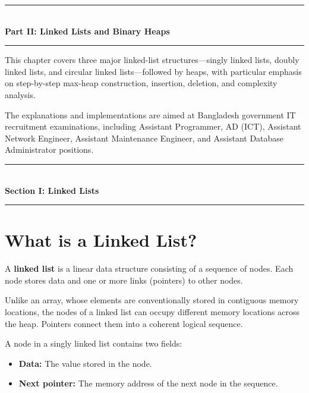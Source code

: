 \begin{center}
\vspace{1em}
{\color{primary}\rule{0.5\textwidth}{1.5pt}}\\[6pt]
{\Large\bfseries\color{primary} Part II: Linked Lists and Binary Heaps}\\[3pt]
{\color{primary}\rule{0.5\textwidth}{1.5pt}}
\vspace{1em}
\end{center}

This chapter covers three major linked-list structures---singly linked lists, doubly linked lists, and circular linked lists---followed by heaps, with particular emphasis on step-by-step max-heap construction, insertion, deletion, and complexity analysis.

The explanations and implementations are aimed at Bangladesh government IT recruitment examinations, including Assistant Programmer, AD (ICT), Assistant Network Engineer, Assistant Maintenance Engineer, and Assistant Database Administrator positions.

\begin{center}
\vspace{0.5em}
{\color{primary}\rule{0.45\textwidth}{1.2pt}}\\[4pt]
{\Large\bfseries\color{primary} Section I: Linked Lists}\\[2pt]
{\color{primary}\rule{0.45\textwidth}{1.2pt}}
\vspace{0.5em}
\end{center}

\section{What is a Linked List?}

A \textbf{linked list} is a linear data structure consisting of a sequence of nodes. Each node stores data and one or more links (pointers) to other nodes.

Unlike an array, whose elements are conventionally stored in contiguous memory locations, the nodes of a linked list can occupy different memory locations across the heap. Pointers connect them into a coherent logical sequence.

A node in a singly linked list contains two fields:
\begin{itemize}
    \item \textbf{Data:} The value stored in the node.
    \item \textbf{Next pointer:} The memory address of the next node in the sequence.
\end{itemize}

